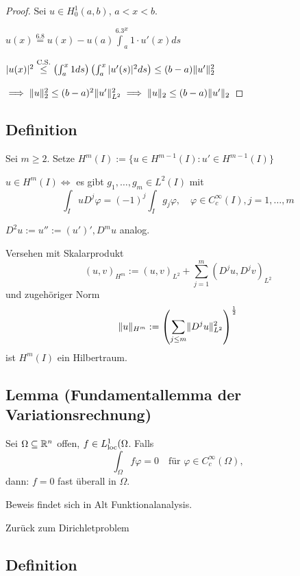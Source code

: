 \begin{proof}
  Sei $u \in H_0^1(a,b)$, $a < x < b$.

  $u(x) \overset{\text{6.8}}{=} u(x) - u(a) \overset{\text{6.3}} \int_a^x 1\cdot u'(x) ds$

  $|u(x)|^2 \overset{\text{C.S.}}{\leq}\left( \int_a^x 1 ds \right) \left( \int_a^x |u'(s)|^2 ds \right) \leq (b-a) \lVert u' \rVert_2^2$

  $\implies \lVert u \rVert_2^2 \leq (b-a)^2 \lVert u' \rVert_{L^2}^2 \implies \lVert u \rVert_2 \leq (b-a) \lVert u' \rVert_2$
\end{proof}

\subsection{Definition}

Sei $m \geq 2$.
Setze
$H^m(I) := \{ u \in H^{m-1}(I) \colon u' \in H^{m-1}(I)\}$

\begin{bem}
  $u \in H^m(I) \iff$ es gibt $g_1,\dots,g_m \in L^2(I)$ mit
  $$
  \int_I uD^j \varphi = (-1)^j \int_I g_j \varphi, \quad\varphi \in C_c^\infty(I), j = 1,\dots,m
  $$
\end{bem}

\begin{ntion}
  $D^2u := u'' := (u')', D^mu$ analog.
\end{ntion}

\begin{bem}
  Versehen mit Skalarprodukt
  $$
  (u,v)_{H^m} := (u,v)_{L^2} + \sum_{j = 1}^m (D^j u, D^j v)_{L^2}
  $$
  und zugehöriger Norm
  $$
  \lVert u \rVert_{H^m} := \left( \sum_{j \leq m} \lVert D^j u  \rVert_{L^2}^2 \right)^{\frac{1}{2}}
  $$
  ist $H^m(I)$ ein Hilbertraum.
\end{bem}

\subsection{Lemma (Fundamentallemma der Variationsrechnung)}

Sei $\Omega \subseteq \mathbb{R}^n$ offen, $f \in L^1_{\operatorname{loc}}(\Omega$.
Falls
$$\int_\Omega f \varphi = 0 \quad \text{für } \varphi \in C_c^\infty(\Omega),$$
dann: $f = 0$ fast überall in $\Omega$.

Beweis findet sich in Alt Funktionalanalysis.

Zurück zum Dirichletproblem

\subsection{Definition}

